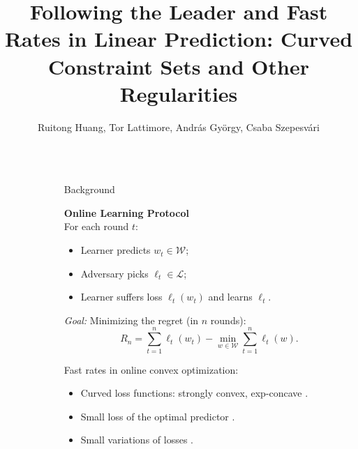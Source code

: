 \documentclass[final]{beamer} %
\title{Following the Leader and Fast Rates in Linear Prediction: Curved Constraint Sets and Other Regularities}
\author{Ruitong Huang, Tor Lattimore, Andr\'as Gy\"orgy, Csaba Szepesv\'{a}ri}
\newcommand{\cL}{\mathcal{L}}
\newcommand{\cW}{\mathcal{W}}
\newcommand{\lt}{\ell_t}
\begin{document}
\begin{frame}[c]
	\vspace{-1.5cm}

	\begin{columns}[t,totalwidth=\textwidth]
	
	\begin{column}{0.01\textwidth}
	\end{column}

		
 	\begin{column}{.32\textwidth}%
	
		\begin{block}{Background}
		\begin{minipage}{.9\linewidth}
			\begin{block}{}
			\vspace{-3.5cm}
			{\centering \bf Online Learning Protocol\\}
			For each round $t$:
				\begin{itemize}
					\item  Learner predicts $w_t\in \cW$;
					\item  Adversary picks $\lt\in \cL$;
					\item  Learner suffers loss $\lt(w_t)$ and learns $\lt$.
				\end{itemize}
			\end{block}	
		\end{minipage}
			
		{\large \it Goal:} Minimizing the regret (in $n$ rounds):
		\[
		R_n = \sum_{t=1}^{n} \lt(w_t) - \min_{w\in\cW} \sum_{t=1}^{n} \lt(w).
		\]
		
		\vspace{1cm}
		{\large Fast rates in online convex optimization:}
		\begin{itemize}
			\item Curved loss functions: strongly convex, exp-concave  \citep{MF92,hazan2007logarithmic,bartlett2007adaptive,kakade2009mind,orabona2012beyond,vanerven2015fast}.
			\item Small loss of the optimal predictor  \citep{FrSc97}.
			\item Small variations of losses   \citep{RakhlinS13}.
		\end{itemize}
	

\end{block}
\end{column}
\end{columns}
\end{frame}
\end{document}
